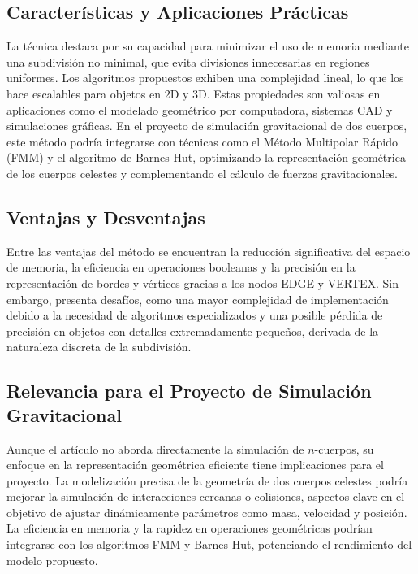 \subsection{Características y Aplicaciones Prácticas}

La técnica destaca por su capacidad para minimizar el uso de memoria mediante una subdivisión no minimal, que evita divisiones innecesarias en regiones uniformes. Los algoritmos propuestos exhiben una complejidad lineal, lo que los hace escalables para objetos en 2D y 3D. Estas propiedades son valiosas en aplicaciones como el modelado geométrico por computadora, sistemas CAD y simulaciones gráficas. En el proyecto de simulación gravitacional de dos cuerpos, este método podría integrarse con técnicas como el Método Multipolar Rápido (FMM) y el algoritmo de Barnes-Hut, optimizando la representación geométrica de los cuerpos celestes y complementando el cálculo de fuerzas gravitacionales.

\subsection{Ventajas y Desventajas}

Entre las ventajas del método se encuentran la reducción significativa del espacio de memoria, la eficiencia en operaciones booleanas y la precisión en la representación de bordes y vértices gracias a los nodos EDGE y VERTEX. Sin embargo, presenta desafíos, como una mayor complejidad de implementación debido a la necesidad de algoritmos especializados y una posible pérdida de precisión en objetos con detalles extremadamente pequeños, derivada de la naturaleza discreta de la subdivisión.

\subsection{Relevancia para el Proyecto de Simulación Gravitacional}

Aunque el artículo no aborda directamente la simulación de \(n\)-cuerpos, su enfoque en la representación geométrica eficiente tiene implicaciones para el proyecto. La modelización precisa de la geometría de dos cuerpos celestes podría mejorar la simulación de interacciones cercanas o colisiones, aspectos clave en el objetivo de ajustar dinámicamente parámetros como masa, velocidad y posición. La eficiencia en memoria y la rapidez en operaciones geométricas podrían integrarse con los algoritmos FMM y Barnes-Hut, potenciando el rendimiento del modelo propuesto.

